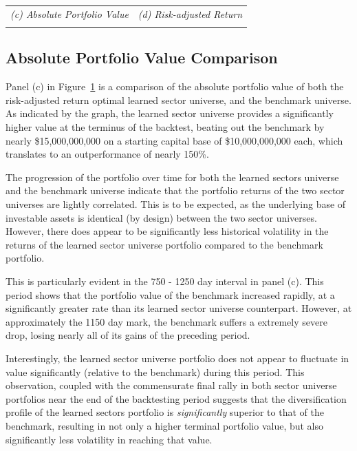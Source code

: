 \documentclass[../main.tex]{subfiles}
\begin{document}
\begin{table}[!h]
\begin{tabular}{|c|c|}
        \textit{(c) Absolute Portfolio Value} & \textit{(d) Risk-adjusted Return} \\
        & \\
        \hline
    \end{tabular}
    \label{fig:benchmark_comparison:performance_metrics}
\end{table}

\pagebreak

\subsection{Absolute Portfolio Value Comparison}

Panel (c) in Figure~\ref{fig:benchmark_comparison:performance_metrics} is a comparison of the absolute portfolio value of both the risk-adjusted return optimal learned sector universe, and the benchmark universe. As indicated by the graph, the learned sector universe provides a significantly higher value at the terminus of the backtest, beating out the benchmark by nearly \$15,000,000,000 on a starting capital base of \$10,000,000,000 each, which translates to an outperformance of nearly 150\%.

The progression of the portfolio over time for both the learned sectors universe and the benchmark universe indicate that the portfolio returns of the two sector universes are lightly correlated. This is to be expected, as the underlying base of investable assets is identical (by design) between the two sector universes. However, there does appear to be significantly less historical volatility in the returns of the learned sector universe portfolio compared to the benchmark portfolio.

This is particularly evident in the 750 - 1250 day interval in panel (c). This period shows that the portfolio value of the benchmark increased rapidly, at a significantly greater rate than its learned sector universe counterpart. However, at approximately the 1150 day mark, the benchmark suffers a extremely severe drop, losing nearly all of its gains of the preceding period.

Interestingly, the learned sector universe portfolio does not appear to fluctuate in value significantly (relative to the benchmark) during this period. This observation, coupled with the commensurate final rally in both sector universe portfolios near the end of the backtesting period suggests that the diversification profile of the learned sectors portfolio is \textit{significantly} superior to that of the benchmark, resulting in not only a higher terminal portfolio value, but also significantly less volatility in reaching that value.
\end{document}
